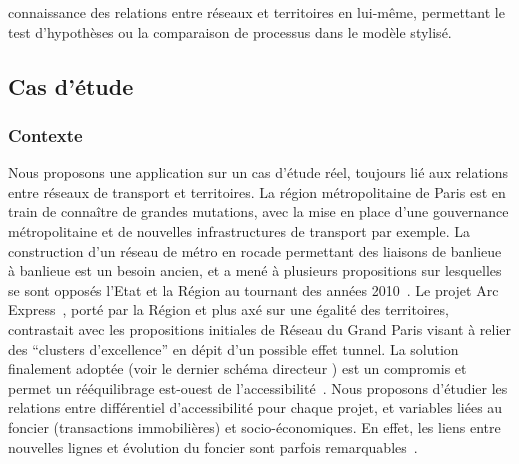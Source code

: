 \documentclass[french]{./sageo}
\begin{document}
connaissance des relations entre réseaux et territoires en lui-même, permettant le test d'hypothèses ou la comparaison de processus dans le modèle stylisé.







\subsection{Cas d'étude}


\subsubsection{Contexte}

Nous proposons une application sur un cas d'étude réel, toujours lié aux relations entre réseaux de transport et territoires. La région métropolitaine de Paris est en train de connaître de grandes mutations, avec la mise en place d'une gouvernance métropolitaine et de nouvelles infrastructures de transport par exemple. La construction d'un réseau de métro en rocade permettant des liaisons de banlieue à banlieue est un besoin ancien, et a mené à plusieurs propositions sur lesquelles se sont opposés l'Etat et la Région au tournant des années 2010~\cite{desjardins2010bataille}. Le projet Arc Express~\cite{stif2007arc}, porté par la Région et plus axé sur une égalité des territoires, contrastait avec les propositions initiales de Réseau du Grand Paris visant à relier des ``clusters d'excellence'' en dépit d'un possible effet tunnel. La solution finalement adoptée (voir le dernier schéma directeur \cite{sdrif2013}) est un compromis et permet un rééquilibrage est-ouest de l'accessibilité~\cite{beaucire2013grand}. Nous proposons d'étudier les relations entre différentiel d'accessibilité pour chaque projet, et variables liées au foncier (transactions immobilières) et socio-économiques. En effet, les liens entre nouvelles lignes et évolution du foncier sont parfois remarquables~\cite{damm1980response}.


\cite{carrouet:hal-00980002}
\end{document}
